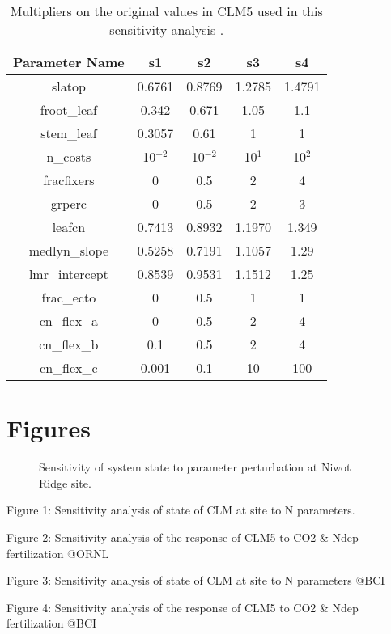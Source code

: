 \documentclass[draft,linenumbers]{agujournal}
\begin{document}
 \begin{table}
\begin{center}
\begin{tabular}{ |c|c|c|c|c| } 
 \hline
 Parameter Name & s1 &s2 & s3 & s4\\
  \hline
 slatop & 0.6761 & 0.8769 &1.2785 &1.4791\\ 
 froot\_leaf &  0.342 &0.671 &1.05 & 1.1\\
 stem\_leaf  &  0.3057 &0.61 &1 &1\\ 
 n\_costs    & 10$^{-2}$ &10$^{-2}$&  10$^{1}$& 10$^{2}$\\
 fracfixers  & 0 &0.5 & 2 & 4 \\
  grperc  &  0 & 0.5& 2 & 3\\
  leafcn  &0.7413 & 0.8932 & 1.1970  & 1.349\\
  
     medlyn\_slope  &0.5258 & 0.7191 & 1.1057  &1.29\\
      lmr\_intercept & 0.8539 & 0.9531 & 1.1512& 1.25\\
      frac\_ecto & 0 &0.5& 1 & 1 \\
      cn\_flex\_a &0 &0.5 & 2  &4\\
      cn\_flex\_b & 0.1 & 0.5 & 2  & 4\\
      cn\_flex\_c &0.001 & 0.1 & 10 & 100\\
\hline
\end{tabular}
\end{center}
\caption{Multipliers on the original values in CLM5 used in this sensitivity analysis .}
\label{table_ranges}
\end{table}



\section{Figures}

\begin{figure}[h]
     \caption{Sensitivity of system state to parameter perturbation at Niwot Ridge site.}
     \label{NWRstate}
  \end{figure}
Figure 1: Sensitivity analysis of state of CLM at site to N parameters.

Figure 2: Sensitivity analysis of the response of CLM5 to CO2 \& Ndep fertilization @ORNL

Figure 3: Sensitivity analysis of state of CLM at site to N parameters @BCI

Figure 4: Sensitivity analysis of the response of CLM5 to CO2 \& Ndep fertilization @BCI
\end{document}
